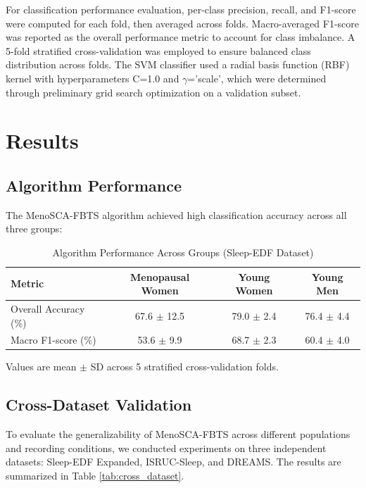 \documentclass[a4paper,fleqn]{cas-dc}
\begin{document}
For classification performance evaluation, per-class precision, recall, and F1-score were computed for each fold, then averaged across folds. Macro-averaged F1-score was reported as the overall performance metric to account for class imbalance. A 5-fold stratified cross-validation was employed to ensure balanced class distribution across folds. The SVM classifier used a radial basis function (RBF) kernel with hyperparameters C=1.0 and $\gamma$='scale', which were determined through preliminary grid search optimization on a validation subset.

\section{Results}\label{sec3}

\subsection{Algorithm Performance}

The MenoSCA-FBTS algorithm achieved high classification accuracy across all three groups:

\begin{table}[!ht]
\centering
\caption{Algorithm Performance Across Groups (Sleep-EDF Dataset)}
\label{tab:performance}
\begin{tabular*}{\textwidth}{@{\extracolsep\fill}lccc@{\extracolsep\fill}}
\toprule
\textbf{Metric} & \textbf{Menopausal Women} & \textbf{Young Women} & \textbf{Young Men} \\
\midrule
Overall Accuracy (\%) & 67.6 $\pm$ 12.5 & 79.0 $\pm$ 2.4 & 76.4 $\pm$ 4.4 \\
Macro F1-score (\%) & 53.6 $\pm$ 9.9 & 68.7 $\pm$ 2.3 & 60.4 $\pm$ 4.0 \\
\bottomrule
\end{tabular*}
\begin{tablenotes}
\small
\item Values are mean $\pm$ SD across 5 stratified cross-validation folds.
\end{tablenotes}
\end{table}

\subsection{Cross-Dataset Validation}

To evaluate the generalizability of MenoSCA-FBTS across different populations and recording conditions, we conducted experiments on three independent datasets: Sleep-EDF Expanded, ISRUC-Sleep, and DREAMS. The results are summarized in Table \ref{tab:cross_dataset}.
\end{document}
